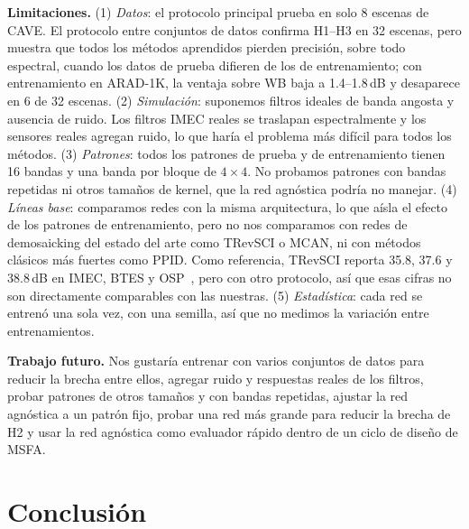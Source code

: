 \documentclass{article}
\begin{document}
\textbf{Limitaciones.} (1) \emph{Datos}: el protocolo principal prueba en
solo 8 escenas de CAVE. El protocolo entre conjuntos de datos confirma H1--H3
en 32 escenas, pero muestra que todos los métodos aprendidos pierden
precisión, sobre todo espectral, cuando los datos de prueba difieren de los
de entrenamiento; con entrenamiento en ARAD-1K, la ventaja sobre WB baja a
1.4--1.8\,dB y desaparece en 6 de 32 escenas. (2) \emph{Simulación}:
suponemos filtros ideales de banda angosta y ausencia de ruido. Los filtros
IMEC reales se traslapan espectralmente y los sensores reales agregan ruido,
lo que haría el problema más difícil para todos los métodos.
(3) \emph{Patrones}: todos los patrones de prueba y de entrenamiento tienen
16 bandas y una banda por bloque de $4\times4$. No probamos patrones con
bandas repetidas ni otros tamaños de kernel, que la red agnóstica podría no
manejar. (4) \emph{Líneas base}: comparamos redes con la misma
arquitectura, lo que aísla el efecto de los patrones de entrenamiento, pero
no nos comparamos con redes de demosaicking del estado del arte como TRevSCI
o MCAN, ni con métodos clásicos más fuertes como PPID. Como referencia,
TRevSCI reporta 35.8, 37.6 y 38.8\,dB en IMEC, BTES y OSP~\cite{diaz2023},
pero con otro protocolo, así que esas cifras no son directamente comparables
con las nuestras. (5) \emph{Estadística}: cada red se entrenó una sola vez,
con una semilla, así que no medimos la variación entre entrenamientos.

\textbf{Trabajo futuro.} Nos gustaría entrenar con varios conjuntos de datos
para reducir la brecha entre ellos, agregar ruido y respuestas reales de los
filtros, probar patrones de otros tamaños y con bandas repetidas, ajustar la
red agnóstica a un patrón fijo, probar una red más grande para reducir la
brecha de H2 y usar la red agnóstica como evaluador rápido dentro de un
ciclo de diseño de MSFA.

\section{Conclusión}
\label{sec:conclusion}
\end{document}
